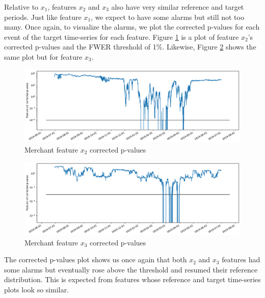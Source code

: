 \documentclass[sigconf]{acmart}
\begin{document}
Relative to $x_1$, features $x_2$ and $x_3$ also have very similar reference and target periods. Just like feature $x_1$, we expect to have some alarms but still not too many. Once again, to visualize the alarms, we plot the corrected p-values for each event of the target time-series for each feature. Figure \ref{fig:merchant-x2-correctedpvalues} is a plot of feature $x_2$'s corrected p-values and the FWER threshold of 1\%. Likewise, Figure \ref{fig:merchant-x3-correctedpvalues} shows the same plot but for feature $x_3$.
\begin{figure}[!htb]
    \begin{center}
      \includegraphics[scale=0.25]{figures/merchant-x2-correctedpvalues.pdf}
      \caption{Merchant feature $x_2$ corrected p-values}
      \label{fig:merchant-x2-correctedpvalues}
    \end{center}
\end{figure}
\begin{figure}[!htb]
    \begin{center}
      \includegraphics[scale=0.25]{figures/merchant-x3-correctedpvalues.pdf}
      \caption{Merchant feature $x_3$ corrected p-values}
      \label{fig:merchant-x3-correctedpvalues}
    \end{center}
\end{figure}
The corrected p-values plot shows us once again that both $x_2$ and $x_3$ features had some alarms but eventually rose above the threshold and resumed their reference distribution. This is expected from features whose reference and target time-series plots look so similar.
\end{document}
